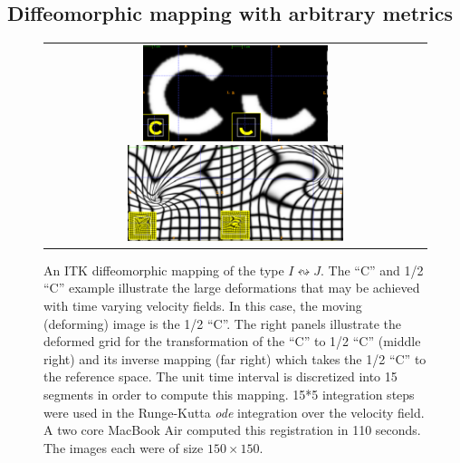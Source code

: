 \documentclass{llncs}
\begin{document}
\subsection{Diffeomorphic mapping with arbitrary metrics}
\begin{figure}[t]
\begin{center}
\begin{tabular}{c}
\includegraphics[height=1.1in]{figs/c_chalf.pdf}
\includegraphics[height=1.1in]{figs/c_half_c_grids.pdf}
\end{tabular}
\caption{\baselineskip 12pt \small An ITK diffeomorphic mapping of the
  type $I \leftrightsquigarrow J $.  The 
``C'' and 1/2 ``C'' example illustrate the large deformations that may
be achieved with time varying velocity fields.  In this case, the moving (deforming) image is
the 1/2 ``C''.  The right panels illustrate the deformed grid for the
transformation of the ``C'' to 1/2 ``C'' (middle right) and its
inverse mapping (far right) which takes the 1/2 ``C'' to the reference
space.  The unit time interval is discretized into 15 segments in
order to compute this mapping.  15*5 integration steps were used in
the Runge-Kutta {\em ode} integration over the velocity field.  A two
core MacBook Air computed this registration in 110 seconds.  The images
each were of size $150 \times 150$.}
\label{fig:chalf}
\end{center}
\end{figure}
\end{document}
